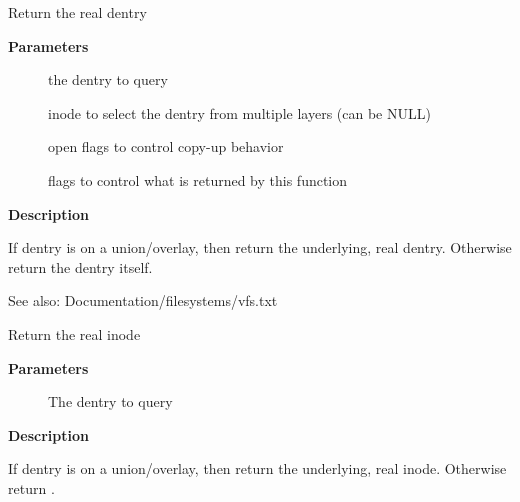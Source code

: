 \documentclass[a4paper,8pt,english]{sphinxmanual}
\begin{document}
\begin{fulllineitems}
\label{filesystems/index:c.d_real}
Return the real dentry

\end{fulllineitems}


\textbf{Parameters}
\begin{description}
\item[{}] \leavevmode
the dentry to query

\item[{}] \leavevmode
inode to select the dentry from multiple layers (can be NULL)

\item[{}] \leavevmode
open flags to control copy-up behavior

\item[{}] \leavevmode
flags to control what is returned by this function

\end{description}

\textbf{Description}

If dentry is on a union/overlay, then return the underlying, real dentry.
Otherwise return the dentry itself.

See also: Documentation/filesystems/vfs.txt

\begin{fulllineitems}
\label{filesystems/index:c.d_real_inode}
Return the real inode

\end{fulllineitems}


\textbf{Parameters}
\begin{description}
\item[{}] \leavevmode
The dentry to query

\end{description}

\textbf{Description}

If dentry is on a union/overlay, then return the underlying, real inode.
Otherwise return {\hyperref[filesystems/index:c.d_inode]{\emph{}}}.
\end{document}

